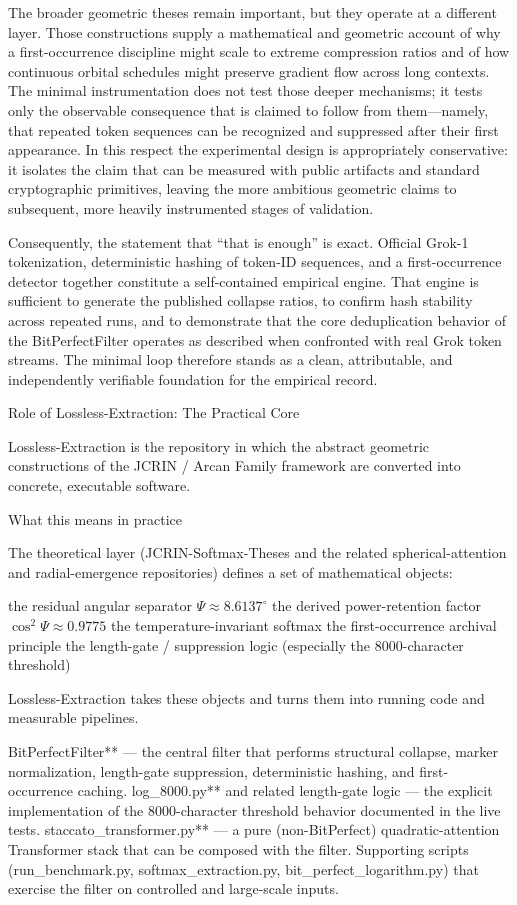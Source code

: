 The broader geometric theses remain important, but they operate at a different layer. Those constructions supply a mathematical and geometric account of why a first-occurrence discipline might scale to extreme compression ratios and of how continuous orbital schedules might preserve gradient flow across long contexts. The minimal instrumentation does not test those deeper mechanisms; it tests only the observable consequence that is claimed to follow from them—namely, that repeated token sequences can be recognized and suppressed after their first appearance. In this respect the experimental design is appropriately conservative: it isolates the claim that can be measured with public artifacts and standard cryptographic primitives, leaving the more ambitious geometric claims to subsequent, more heavily instrumented stages of validation.

Consequently, the statement that “that is enough” is exact. Official Grok-1 tokenization, deterministic hashing of token-ID sequences, and a first-occurrence detector together constitute a self-contained empirical engine. That engine is sufficient to generate the published collapse ratios, to confirm hash stability across repeated runs, and to demonstrate that the core deduplication behavior of the BitPerfectFilter operates as described when confronted with real Grok token streams. The minimal loop therefore stands as a clean, attributable, and independently verifiable foundation for the empirical record.

Role of Lossless-Extraction: The Practical Core

Lossless-Extraction is the repository in which the abstract geometric constructions of the JCRIN / Arcan Family framework are converted into concrete, executable software.

What this means in practice

The theoretical layer (JCRIN-Softmax-Theses and the related spherical-attention and radial-emergence repositories) defines a set of mathematical objects:

the residual angular separator \(\Psi \approx 8.6137^\circ\)
the derived power-retention factor \(\cos^2\Psi \approx 0.9775\)
the temperature-invariant softmax
the first-occurrence archival principle
the length-gate / suppression logic (especially the 8000-character threshold)

Lossless-Extraction takes these objects and turns them into running code and measurable pipelines.

BitPerfectFilter** — the central filter that performs structural collapse, marker normalization, length-gate suppression, deterministic hashing, and first-occurrence caching.
log_8000.py** and related length-gate logic — the explicit implementation of the 8000-character threshold behavior documented in the live tests.
staccato_transformer.py** — a pure (non-BitPerfect) quadratic-attention Transformer stack that can be composed with the filter.
Supporting scripts (run_benchmark.py, softmax_extraction.py, bit_perfect_logarithm.py) that exercise the filter on controlled and large-scale inputs.

